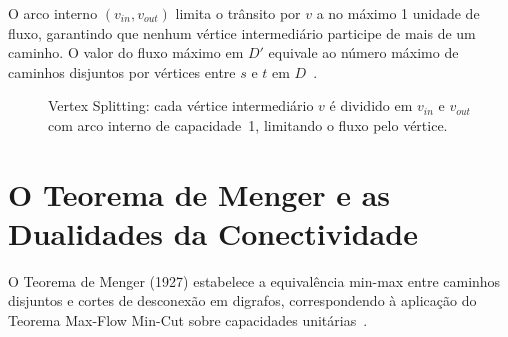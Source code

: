 O arco interno $(v_{in}, v_{out})$ limita o trânsito por $v$ a no máximo 1 unidade de fluxo, garantindo que nenhum vértice intermediário participe de mais de um caminho. O valor do fluxo máximo em $D'$ equivale ao número máximo de caminhos disjuntos por vértices entre $s$ e $t$ em $D$~\cite{korte2018combinatorial}.

\begin{figure}[!ht]
\centering
{}
\caption{Vertex Splitting: cada vértice intermediário $v$ é dividido em $v_{in}$ e $v_{out}$ com arco interno de capacidade~1, limitando o fluxo pelo vértice.}
\label{fig:divisao_vertices}
\end{figure}


\section{O Teorema de Menger e as Dualidades da Conectividade}

O Teorema de Menger (1927) estabelece a equivalência min-max entre caminhos disjuntos e cortes de desconexão em digrafos, correspondendo à aplicação do Teorema Max-Flow Min-Cut sobre capacidades unitárias~\cite{ahuja1993network, cook1998combinatorial}.


